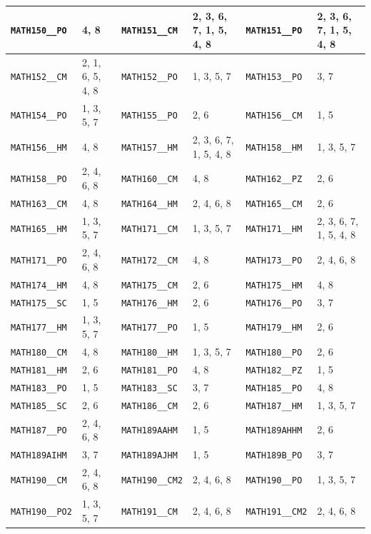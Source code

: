 \begin{longtable}{|l|l||l|l||l|l|}
    \verb|MATH150__PO| & 4, 8 & \verb|MATH151__CM| & 2, 3, 6, 7, 1, 5, 4, 8 & \verb|MATH151__PO| & 2, 3, 6, 7, 1, 5, 4, 8\\\hline
    \verb|MATH152__CM| & 2, 1, 6, 5, 4, 8 & \verb|MATH152__PO| & 1, 3, 5, 7 & \verb|MATH153__PO| & 3, 7\\\hline
    \verb|MATH154__PO| & 1, 3, 5, 7 & \verb|MATH155__PO| & 2, 6 & \verb|MATH156__CM| & 1, 5\\\hline
    \verb|MATH156__HM| & 4, 8 & \verb|MATH157__HM| & 2, 3, 6, 7, 1, 5, 4, 8 & \verb|MATH158__HM| & 1, 3, 5, 7\\\hline
    \verb|MATH158__PO| & 2, 4, 6, 8 & \verb|MATH160__CM| & 4, 8 & \verb|MATH162__PZ| & 2, 6\\\hline
    \verb|MATH163__CM| & 4, 8 & \verb|MATH164__HM| & 2, 4, 6, 8 & \verb|MATH165__CM| & 2, 6\\\hline
    \verb|MATH165__HM| & 1, 3, 5, 7 & \verb|MATH171__CM| & 1, 3, 5, 7 & \verb|MATH171__HM| & 2, 3, 6, 7, 1, 5, 4, 8\\\hline
    \verb|MATH171__PO| & 2, 4, 6, 8 & \verb|MATH172__CM| & 4, 8 & \verb|MATH173__PO| & 2, 4, 6, 8\\\hline
    \verb|MATH174__HM| & 4, 8 & \verb|MATH175__CM| & 2, 6 & \verb|MATH175__HM| & 4, 8\\\hline
    \verb|MATH175__SC| & 1, 5 & \verb|MATH176__HM| & 2, 6 & \verb|MATH176__PO| & 3, 7\\\hline
    \verb|MATH177__HM| & 1, 3, 5, 7 & \verb|MATH177__PO| & 1, 5 & \verb|MATH179__HM| & 2, 6\\\hline
    \verb|MATH180__CM| & 4, 8 & \verb|MATH180__HM| & 1, 3, 5, 7 & \verb|MATH180__PO| & 2, 6\\\hline
    \verb|MATH181__HM| & 2, 6 & \verb|MATH181__PO| & 4, 8 & \verb|MATH182__PZ| & 1, 5\\\hline
    \verb|MATH183__PO| & 1, 5 & \verb|MATH183__SC| & 3, 7 & \verb|MATH185__PO| & 4, 8\\\hline
    \verb|MATH185__SC| & 2, 6 & \verb|MATH186__CM| & 2, 6 & \verb|MATH187__HM| & 1, 3, 5, 7\\\hline
    \verb|MATH187__PO| & 2, 4, 6, 8 & \verb|MATH189AAHM| & 1, 5 & \verb|MATH189AHHM| & 2, 6\\\hline
    \verb|MATH189AIHM| & 3, 7 & \verb|MATH189AJHM| & 1, 5 & \verb|MATH189B_PO| & 3, 7\\\hline
    \verb|MATH190__CM| & 2, 4, 6, 8 & \verb|MATH190__CM2| & 2, 4, 6, 8 & \verb|MATH190__PO| & 1, 3, 5, 7\\\hline
    \verb|MATH190__PO2| & 1, 3, 5, 7 & \verb|MATH191__CM| & 2, 4, 6, 8 & \verb|MATH191__CM2| & 2, 4, 6, 8\\\hline

\end{longtable}
